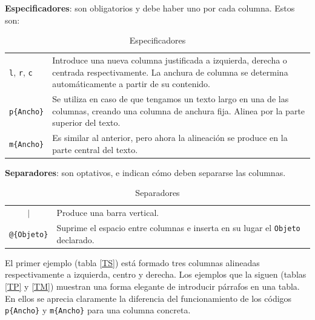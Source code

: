 \documentclass[10pt,a4paper]{article}
\begin{document}
\vspace{1cm}

\noindent\textbf{Especificadores}: son obligatorios y debe haber uno por cada columna. Estos son:

\begin{table}[h!]
\begin{tabular}{|lp{13cm}|}
\hline
\texttt{l}, \texttt{r}, \texttt{c} 
& Introduce una nueva columna justificada a izquierda, derecha o centrada respectivamente. La anchura de columna se determina automáticamente a partir de su contenido.
\\
\verb/p{Ancho}/
& Se utiliza en caso de que tengamos un texto largo en una de las columnas, creando una columna de anchura fija. Alinea por la parte superior del texto.
\\
\verb/m{Ancho}/
& Es similar al anterior, pero ahora la alineación se produce en la parte central del texto.\\
\hline
\end{tabular}
\caption[Especificadores]{Especificadores}
\end{table}

\vspace{1cm}

\noindent\textbf{Separadores}: son optativos, e indican cómo deben separarse las columnas.

\begin{table}[h!]
\begin{tabular}{|cp{13cm}|}\hline
 $|$ & Produce una barra vertical. \\
\verb/@{Objeto}/ & Suprime el espacio entre columnas e inserta en su lugar el \texttt{Objeto} declarado.\\
\hline
\end{tabular}
\caption[Separadores]{Separadores}
\end{table}


\bigskip

El primer ejemplo (tabla \ref{TS}) está formado tres columnas alineadas respectivamente a izquierda, centro y derecha. Los ejemplos que la siguen (tablas \ref{TP} y \ref{TM}) muestran una forma elegante de introducir párrafos en una tabla. En ellos se aprecia claramente la diferencia del funcionamiento de los códigos \verb/p{Ancho}/ y \verb/m{Ancho}/ para una columna concreta.
\end{document}
